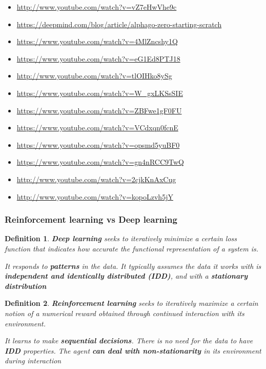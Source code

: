 \documentclass{article}
\newtheorem{theorem}{Definition}[section]
\begin{document}
\begin{itemize}
    \item \url{http://www.youtube.com/watch?v=vZ7eHwVhe9c}
    \item \url{https://deepmind.com/blog/article/alphago-zero-starting-scratch}
    \item \url{https://www.youtube.com/watch?v=4MlZncshy1Q}
    \item \url{https://www.youtube.com/watch?v=eG1Ed8PTJ18}
    \item \url{http://www.youtube.com/watch?v=tlOIHko8ySg}
    \item \url{https://www.youtube.com/watch?v=W_gxLKSsSIE}
    \item \url{https://www.youtube.com/watch?v=ZBFwe1gF0FU}
    \item \url{https://www.youtube.com/watch?v=VCdxqn0fcnE}
    \item \url{https://www.youtube.com/watch?v=opsmd5yuBF0}
    \item \url{https://www.youtube.com/watch?v=gn4nRCC9TwQ}
    \item \url{http://www.youtube.com/watch?v=2cjkKnAxCug}
    \item \url{http://www.youtube.com/watch?v=kopoLzvh5jY}
\end{itemize}

\subsubsection{Reinforcement learning vs Deep learning}

\begin{theorem}
    \textbf{Deep learning} seeks to iteratively minimize a certain loss function 
    that indicates how accurate the functional representation of a system is.

    It responds to \textbf{patterns} in the data. It typically assumes the data
    it works with is \textbf{independent and identically distributed (IDD)}, and
    with a \textbf{stationary distribution}
\end{theorem}

\begin{theorem}
    \textbf{Reinforcement learning} seeks to iteratively maximize a certain notion of a numerical reward obtained through
    continued interaction with its environment.

    It learns to make \textbf{sequential decisions}. There is no need for the data
    to have \textbf{IDD} properties. The agent \textbf{can deal with non-stationarity} in 
    its environment during interaction
\end{theorem}
\end{document}
